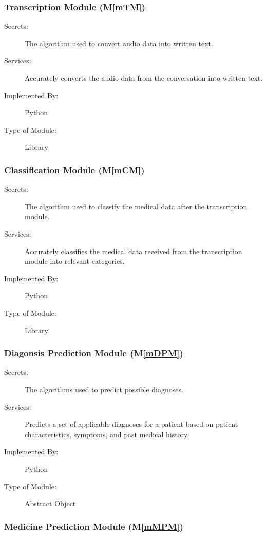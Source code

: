 \documentclass[12pt, titlepage]{article}
\newcommand{\mref}[1]{M\ref{#1}}
\begin{document}
\subsubsection{Transcription Module (\mref{mTM})}

\begin{description}
\item[Secrets:] The algorithm used to convert audio data into written text.
\item[Services:] Accurately converts the audio data from the conversation into written text.   
\item[Implemented By:] Python
\item[Type of Module:] Library
\end{description}

\subsubsection{Classification Module (\mref{mCM})}

\begin{description}
\item[Secrets:] The algorithm used to classify the medical data after the transcription module.
\item[Services:] Accurately classifies the medical data received from the transcription module into relevant categories.
\item[Implemented By:] Python
\item[Type of Module:] Library
\end{description}

\subsubsection{Diagonsis Prediction Module (\mref{mDPM})}

\begin{description}
\item[Secrets:] The algorithms used to predict possible diagnoses.
\item[Services:] Predicts a set of applicable diagnoses for a patient based on patient characteristics, symptoms, and past medical history.
\item[Implemented By:] Python
\item[Type of Module:] Abstract Object
\end{description}

\subsubsection{Medicine Prediction Module (\mref{mMPM})}
\end{document}
